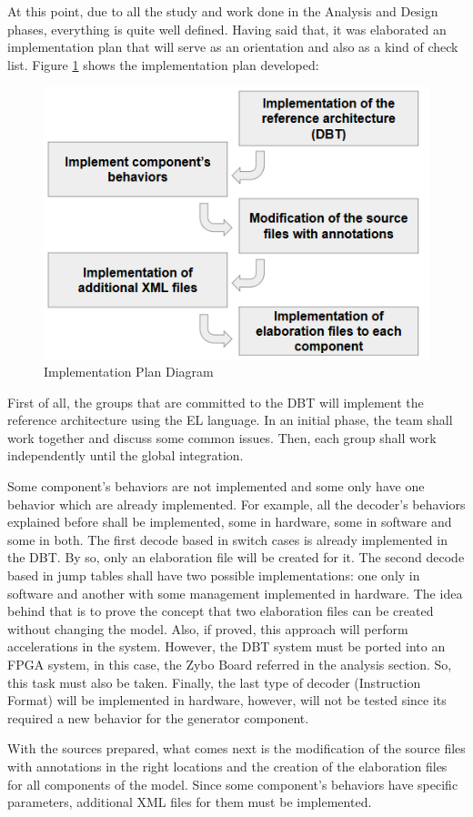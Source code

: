 At this point, due to all the study and work done in the Analysis and Design phases, everything is quite well defined. Having said that, it was elaborated an implementation plan that will serve as an orientation and also as a kind of check list. Figure \ref{fig:implementation_plan} shows the implementation plan developed:

\begin{figure}[!htb]
\centerline{
\includegraphics[scale=0.75]{images/Implementation_Plan.png}
}
\caption{Implementation Plan Diagram}
\label{fig:implementation_plan} 
\end{figure}

First of all, the groups that are committed to the DBT will implement the reference architecture using the EL language. In an initial phase, the team shall work together and discuss some common issues. Then, each group shall work independently until the global integration. 

Some component's behaviors are not implemented and some only have one behavior which are already implemented. For example, all the decoder's behaviors explained before shall be implemented, some in hardware, some in software and some in both. The first decode based in switch cases is already implemented in the DBT. By so, only an elaboration file will be created for it. The second decode based in jump tables shall have two possible implementations: one only in software and another with some management implemented in hardware. The idea behind that is to prove the concept that two elaboration files can be created without changing the model. Also, if proved, this approach will perform accelerations in the system. However, the DBT system must be ported into an FPGA system, in this case, the Zybo Board referred in the analysis section. So, this task must also be taken. Finally, the last type of decoder (Instruction Format) will be implemented in hardware, however, will not be tested since its required a new behavior for the generator component. 

With the sources prepared, what comes next is the modification of the source files with annotations in the right locations and the creation of the elaboration files for all components of the model. Since some component's behaviors have specific parameters, additional XML files for them must be implemented. 


